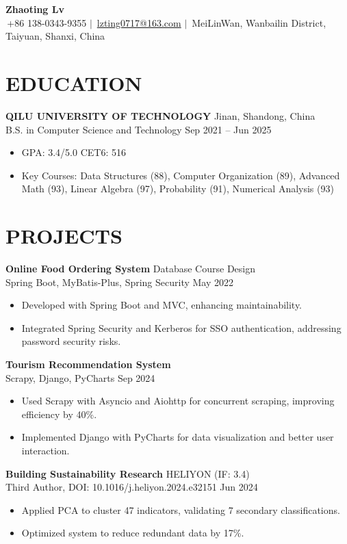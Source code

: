 \documentclass[a4paper,11pt]{article}
\newenvironment{resumeList}{\begin{itemize}[leftmargin=*, label=\textbullet{}, itemsep=2pt]}{\end{itemize}}
\newcommand{\resumeItem}[1]{\item\small{#1}}
\newcommand{\resumeEntry}[4]{%
  \textbf{#1} \hfill #2 \\
  \small #3 \hfill #4
  \vspace{-3pt}
}
\begin{document}
\normalsize  

\begin{center}
    {\bfseries\huge Zhaoting Lv} \\[3pt]
    \small
    \faMobile\,+86 138-0343-9355 \quad $|$ \quad 
    \faAt\,\href{mailto:lvzting0717@163.com}{lzting0717@163.com} \quad $|$ \quad 
    \faMapMarker\,MeiLinWan, Wanbailin District, Taiyuan, Shanxi, China
\end{center}

\section{EDUCATION}
\resumeEntry{QILU UNIVERSITY OF TECHNOLOGY}{Jinan, Shandong, China}
{B.S. in Computer Science and Technology}{Sep 2021 -- Jun 2025}
\begin{resumeList}
    \resumeItem{GPA: 3.4/5.0 \quad CET6: 516} 
    \resumeItem{Key Courses: Data Structures (88), Computer Organization (89), Advanced Math (93), Linear Algebra (97), Probability (91), Numerical Analysis (93)}
\end{resumeList}

\section{PROJECTS}
\resumeEntry{Online Food Ordering System}{Database Course Design}
{Spring Boot, MyBatis-Plus, Spring Security}{May 2022}
\begin{resumeList}
    \resumeItem{Developed with Spring Boot and MVC, enhancing maintainability.}
    \resumeItem{Integrated Spring Security and Kerberos for SSO authentication, addressing password security risks.}
\end{resumeList}

\resumeEntry{Tourism Recommendation System}{}{Scrapy, Django, PyCharts}{Sep 2024}
\begin{resumeList}
    \resumeItem{Used Scrapy with Asyncio and Aiohttp for concurrent scraping, improving efficiency by 40\%.}
    \resumeItem{Implemented Django with PyCharts for data visualization and better user interaction.}
\end{resumeList}

\resumeEntry{Building Sustainability Research}{HELIYON (IF: 3.4)}
{Third Author, DOI: 10.1016/j.heliyon.2024.e32151}{Jun 2024}
\begin{resumeList}
    \resumeItem{Applied PCA to cluster 47 indicators, validating 7 secondary classifications.}
    \resumeItem{Optimized system to reduce redundant data by 17\%.}
\end{resumeList}
\end{document}
